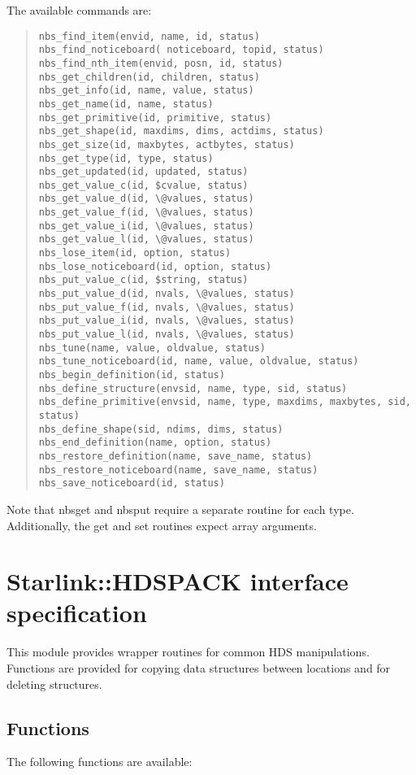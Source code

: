\documentclass[twoside,11pt]{article}
\newenvironment{myquote}{\begin{quote}\begin{small}}{\end{small}\end{quote}}
\renewcommand{\_}{\texttt{\symbol{95}}}
\begin{document}
The available commands are:
\begin{myquote}
\begin{verbatim}
nbs_find_item(envid, name, id, status)
nbs_find_noticeboard( noticeboard, topid, status)
nbs_find_nth_item(envid, posn, id, status)
nbs_get_children(id, children, status)
nbs_get_info(id, name, value, status)
nbs_get_name(id, name, status)
nbs_get_primitive(id, primitive, status)
nbs_get_shape(id, maxdims, dims, actdims, status)
nbs_get_size(id, maxbytes, actbytes, status)
nbs_get_type(id, type, status)
nbs_get_updated(id, updated, status)
nbs_get_value_c(id, $cvalue, status)
nbs_get_value_d(id, \@values, status)
nbs_get_value_f(id, \@values, status)
nbs_get_value_i(id, \@values, status)
nbs_get_value_l(id, \@values, status)
nbs_lose_item(id, option, status)
nbs_lose_noticeboard(id, option, status)
nbs_put_value_c(id, $string, status)
nbs_put_value_d(id, nvals, \@values, status)
nbs_put_value_f(id, nvals, \@values, status)
nbs_put_value_i(id, nvals, \@values, status)
nbs_put_value_l(id, nvals, \@values, status)
nbs_tune(name, value, oldvalue, status)
nbs_tune_noticeboard(id, name, value, oldvalue, status)
nbs_begin_definition(id, status)
nbs_define_structure(envsid, name, type, sid, status)
nbs_define_primitive(envsid, name, type, maxdims, maxbytes, sid, status)
nbs_define_shape(sid, ndims, dims, status)
nbs_end_definition(name, option, status)
nbs_restore_definition(name, save_name, status)
nbs_restore_noticeboard(name, save_name, status)
nbs_save_noticeboard(id, status)
\end{verbatim}
\end{myquote}

Note that nbs\_{}get\_{} and nbs\_{}put\_{} require a separate routine for each
type. Additionally, the get and set routines expect array arguments.

\section{Starlink::HDSPACK interface specification}%

This module provides wrapper routines for common HDS manipulations.
Functions are provided for copying data structures between locations
and for deleting structures.

\subsection{Functions}%

The following functions are available:
\end{document}
